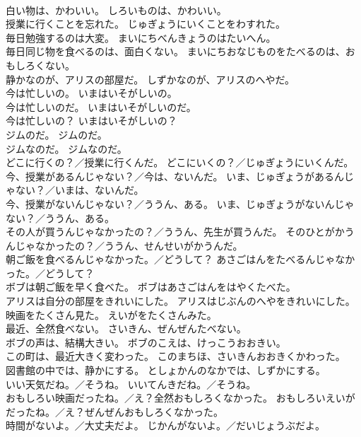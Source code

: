 \documentclass[8pt]{extreport}
\begin{document}
\begin{CJK}{UTF8}{min}
\\	白い物は、かわいい。	しろいものは、かわいい。 
\\	授業に行くことを忘れた。	じゅぎょうにいくことをわすれた。 
\\	毎日勉強するのは大変。	まいにちべんきょうのはたいへん。 
\\	毎日同じ物を食べるのは、面白くない。	まいにちおなじものをたべるのは、おもしろくない。 
\\	静かなのが、アリスの部屋だ。	しずかなのが、アリスのへやだ。 
\\	今は忙しいの。	いまはいそがしいの。 
\\	今は忙しいのだ。	いまはいそがしいのだ。 
\\	今は忙しいの？	いまはいそがしいの？ 
\\	ジムのだ。	ジムのだ。 
\\	ジムなのだ。	ジムなのだ。 
\\	どこに行くの？／授業に行くんだ。	どこにいくの？／じゅぎょうにいくんだ。 
\\	今、授業があるんじゃない？／今は、ないんだ。	いま、じゅぎょうがあるんじゃない？／いまは、ないんだ。 
\\	今、授業がないんじゃない？／ううん、ある。	いま、じゅぎょうがないんじゃない？／ううん、ある。 
\\	その人が買うんじゃなかったの？／ううん、先生が買うんだ。	そのひとがかうんじゃなかったの？／ううん、せんせいがかうんだ。 
\\	朝ご飯を食べるんじゃなかった。／どうして？	あさごはんをたべるんじゃなかった。／どうして？ 
\\	ボブは朝ご飯を早く食べた。	ボブはあさごはんをはやくたべた。 
\\	アリスは自分の部屋をきれいにした。	アリスはじぶんのへやをきれいにした。 
\\	映画をたくさん見た。	えいがをたくさんみた。 
\\	最近、全然食べない。	さいきん、ぜんぜんたべない。 
\\	ボブの声は、結構大きい。	ボブのこえは、けっこうおおきい。 
\\	この町は、最近大きく変わった。	このまちほ、さいきんおおきくかわった。 
\\	図書館の中では、静かにする。	としょかんのなかでは、しずかにする。 
\\	いい天気だね。／そうね。	いいてんきだね。／そうね。 
\\	おもしろい映画だったね。／え？全然おもしろくなかった。	おもしろいえいがだったね。／え？ぜんぜんおもしろくなかった。 
\\	時間がないよ。／大丈夫だよ。	じかんがないよ。／だいじょうぶだよ。 

\end{CJK}
\end{document}
